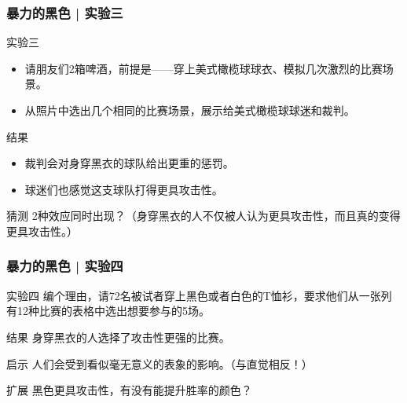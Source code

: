 \begin{frame}
  \frametitle{暴力的黑色 | 实验三}
  \begin{block}{实验三}
    \begin{itemize}
      \item 请朋友们2箱啤酒，前提是——穿上美式橄榄球球衣、模拟几次激烈的比赛场景。
      \item 从照片中选出几个相同的比赛场景，展示给美式橄榄球球迷和裁判。
    \end{itemize}
  \end{block}
  \pause
  \begin{block}{结果}
    \begin{itemize}
      \item 裁判会对身穿黑衣的球队给出更重的惩罚。
      \item 球迷们也感觉这支球队打得更具攻击性。
    \end{itemize}
  \end{block}
  \pause
  \begin{block}{猜测}
    2种效应同时出现？（身穿黑衣的人不仅被人认为更具攻击性，而且真的变得更具攻击性。）
  \end{block}
\end{frame}

\begin{frame}
  \frametitle{暴力的黑色 | 实验四}
  \begin{block}{实验四}
    编个理由，请72名被试者穿上黑色或者白色的T恤衫，要求他们从一张列有12种比赛的表格中选出想要参与的5场。
  \end{block}
  \pause
  \begin{block}{结果}
  身穿黑衣的人选择了攻击性更强的比赛。
  \end{block}
  \pause
  \begin{block}{启示}
    人们会受到看似毫无意义的表象的影响。（与直觉相反！）
  \end{block}
  \pause
  \begin{block}{扩展}
    黑色更具攻击性，有没有能提升胜率的颜色？
  \end{block}
\end{frame}

